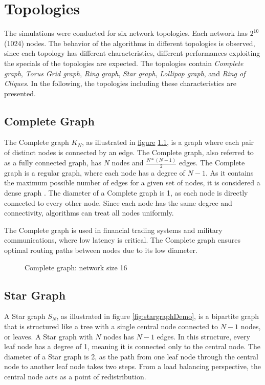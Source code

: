 \chapter{Topologies}\label{chap:topologies}
The simulations were conducted for six network topologies. Each network has $2^{10}$ (1024) nodes. The behavior of the algorithms in different topologies is observed, since each topology has different characteristics, different performances exploiting the specials of the topologies are expected. The topologies contain \textit{Complete graph}, \textit{Torus Grid graph}, \textit{Ring graph}, \textit{Star graph}, \textit{Lollipop graph}, and \textit{Ring of Cliques}. In the following, the topologies including these characteristics are presented.

\section{Complete Graph}\label{sec:2completegraph}
The Complete graph $K_N$, as illustrated in \hyperref[fig:completegraphDemo]{figure} \ref{fig:completegraphDemo}, is a graph where each pair of distinct nodes is connected by an edge. The Complete graph, also referred to as a fully connected graph, has $N$ nodes and $\frac{N*(N-1)}{2}$ edges. The Complete graph is a regular graph, where each node has a degree of $N-1$. As it contains the maximum possible number of edges for a given set of nodes, it is considered a dense graph \cite{GraphTheorySchindelhaauer2021}. The diameter of a Complete graph is 1, as each node is directly connected to every other node. Since each node has the same degree and connectivity, algorithms can treat all nodes uniformly.

The Complete graph is used in financial trading systems and military communications, where low latency is critical. The Complete graph ensures optimal routing paths between nodes due to its low diameter. \cite{Banerjee2001}

\begin{figure}[H]
    \centering
    
    \caption{Complete graph: network size 16}
    \label{fig:completegraphDemo}
\end{figure}

\section{Star Graph}\label{sec:2stargraph}
A Star graph $S_N$, as illustrated in figure \ref{fig:stargraphDemo}, is a bipartite graph \cite{west2001introduction} that is structured like a tree with a single central node connected to $N-1$ nodes, or leaves. A Star graph with $N$ nodes has $N-1$ edges. In this structure, every leaf node has a degree of 1, meaning it is connected only to the central node. The diameter of a Star graph is 2, as the path from one leaf node through the central node to another leaf node takes two steps. From a load balancing perspective, the central node acts as a point of redistribution.

